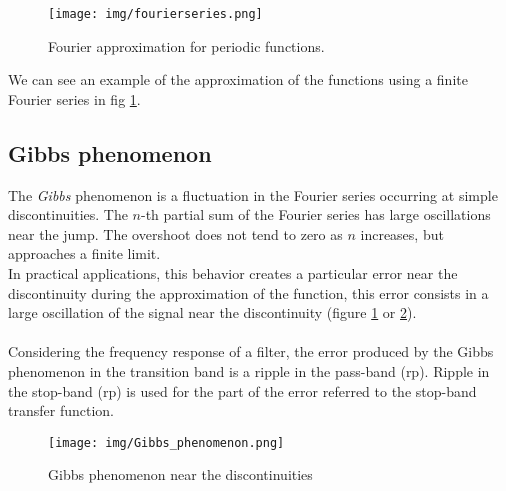 \begin{figure}[h]\centering
\texttt{[image: img/fourierseries.png]} 
\caption{Fourier approximation for periodic functions.} \label{fig:fourierseries}
\end{figure}
We can see an example of the approximation of the functions using a finite Fourier series in fig \ref{fig:fourierseries}.
\subsection{Gibbs phenomenon}
The \textit{Gibbs} phenomenon is a fluctuation in the Fourier series occurring at simple discontinuities.
The $n$-th partial sum of the Fourier series has large oscillations near the jump. The overshoot does not tend to zero as $n$ increases, but approaches a finite limit.\\
In practical applications, this behavior creates a particular error near the discontinuity during the approximation of the function, this error consists in a large oscillation of the signal near the discontinuity (figure \ref{fig:fourierseries} or \ref{fig:gibbs}).\\\\
Considering the frequency response of a filter, the error produced by the Gibbs phenomenon in the transition band is a ripple in the pass-band (rp). Ripple in the stop-band (rp) is used for the part of the error referred to the stop-band transfer function.
\begin{figure}[h]\centering
\texttt{[image: img/Gibbs\_phenomenon.png]} 
\caption{Gibbs phenomenon near the discontinuities} \label{fig:gibbs}
\end{figure}

